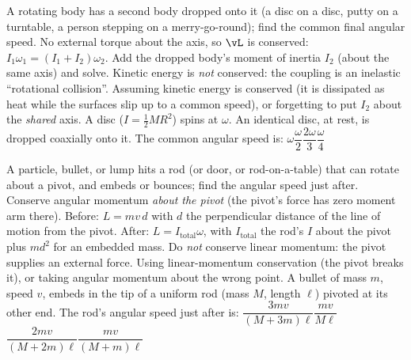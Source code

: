 {A rotating body has a second body dropped onto it (a disc on a disc, putty on a turntable, a person
stepping on a merry-go-round); find the common final angular speed.}
{No external torque about the axis, so $\vL$ is conserved: $I_1\omega_1=(I_1+I_2)\omega_2$. Add the
dropped body's moment of inertia $I_2$ (about the same axis) and solve. Kinetic energy is \emph{not}
conserved: the coupling is an inelastic ``rotational collision''.}
{Assuming kinetic energy is conserved (it is dissipated as heat while the surfaces slip up to a common speed), or forgetting
to put $I_2$ about the \emph{shared} axis.}
{A disc ($I=\tfrac{1}{2}MR^2$) spins at $\omega$. An identical disc, at rest, is dropped coaxially onto it.
The common angular speed is:}
{$\omega$}{$\dfrac{\omega}{2}$}{$\dfrac{2\omega}{3}$}{$\dfrac{\omega}{4}$}

{A particle, bullet, or lump hits a rod (or door, or rod-on-a-table) that can rotate about a pivot, and
embeds or bounces; find the angular speed just after.}
{Conserve angular momentum \emph{about the pivot} (the pivot's force has zero moment arm there). Before:
$L=mv\,d$ with $d$ the perpendicular distance of the line of motion from the pivot. After:
$L=I_{\text{total}}\omega$, with $I_{\text{total}}$ the rod's $I$ about the pivot plus $md^2$ for an
embedded mass. Do \emph{not} conserve linear momentum: the pivot supplies an external force.}
{Using linear-momentum conservation (the pivot breaks it), or taking angular momentum about the wrong
point.}
{A bullet of mass $m$, speed $v$, embeds in the tip of a uniform rod (mass $M$, length $\ell$) pivoted at
its other end. The rod's angular speed just after is:}
{$\dfrac{3mv}{(M+3m)\ell}$}{$\dfrac{mv}{M\ell}$}{$\dfrac{2mv}{(M+2m)\ell}$}{$\dfrac{mv}{(M+m)\ell}$}

